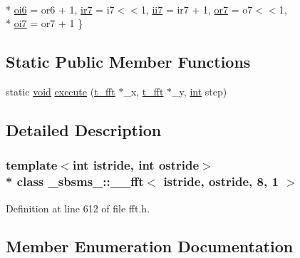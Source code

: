 \begin{DoxyCompactItemize}
\\*
\hyperlink{class__sbsms___1_1____fft_3_01istride_00_01ostride_00_018_00_011_01_4_ac2fcb2edbd29c4fb283091ca18344364a759fe16e45fdc83e3c683c581114c93a}{oi6} = or6 + 1, 
\hyperlink{class__sbsms___1_1____fft_3_01istride_00_01ostride_00_018_00_011_01_4_ac2fcb2edbd29c4fb283091ca18344364ad436d9874cd1b90b6e414c48a60e9ec5}{ir7} = i7$<$$<$1, 
\hyperlink{class__sbsms___1_1____fft_3_01istride_00_01ostride_00_018_00_011_01_4_ac2fcb2edbd29c4fb283091ca18344364a6c02a0501c127ee2015273c009bc8963}{ii7} = ir7 + 1, 
\hyperlink{class__sbsms___1_1____fft_3_01istride_00_01ostride_00_018_00_011_01_4_ac2fcb2edbd29c4fb283091ca18344364acaf998fd65c52292c929524e6a77d3a4}{or7} = o7$<$$<$1, 
\\*
\hyperlink{class__sbsms___1_1____fft_3_01istride_00_01ostride_00_018_00_011_01_4_ac2fcb2edbd29c4fb283091ca18344364ac3e606e77d2838421cf96e058c868c50}{oi7} = or7 + 1
 \}
\end{DoxyCompactItemize}
\subsection*{Static Public Member Functions}
\begin{DoxyCompactItemize}
\item 
static \hyperlink{sound_8c_ae35f5844602719cf66324f4de2a658b3}{void} \hyperlink{class__sbsms___1_1____fft_3_01istride_00_01ostride_00_018_00_011_01_4_aa6b547bb265ccab898698476c8f1949e}{execute} (\hyperlink{namespace__sbsms___af5c6f976b2da21c36853e3b0c5995a54}{t\+\_\+fft} $\ast$\+\_\+x, \hyperlink{namespace__sbsms___af5c6f976b2da21c36853e3b0c5995a54}{t\+\_\+fft} $\ast$\+\_\+y, \hyperlink{xmltok_8h_a5a0d4a5641ce434f1d23533f2b2e6653}{int} step)
\end{DoxyCompactItemize}


\subsection{Detailed Description}
\subsubsection*{template$<$int istride, int ostride$>$\\*
class \+\_\+sbsms\+\_\+\+::\+\_\+\+\_\+fft$<$ istride, ostride, 8, 1 $>$}



Definition at line 612 of file fft.\+h.



\subsection{Member Enumeration Documentation}
